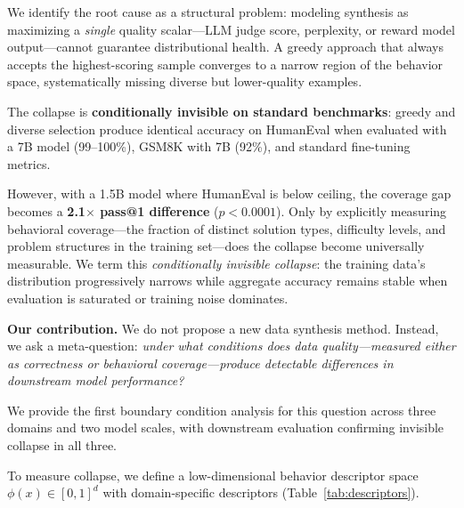 \documentclass{article}
\theoremstyle{plain}
\theoremstyle{remark}
\begin{document}
We identify the root cause as a structural problem: modeling synthesis as maximizing a \emph{single} quality scalar---LLM judge score, perplexity, or reward model output---cannot guarantee distributional health. A greedy approach that always accepts the highest-scoring sample converges to a narrow region of the behavior space, systematically missing diverse but lower-quality examples.

The collapse is \textbf{conditionally invisible on standard benchmarks}: greedy and diverse selection produce identical accuracy on HumanEval when evaluated with a 7B model (99--100\%), GSM8K with 7B (92\%), and standard fine-tuning metrics.

However, with a 1.5B model where HumanEval is below ceiling, the coverage gap becomes a \textbf{2.1$\times$ pass@1 difference} ($p{<}0.0001$).
Only by explicitly measuring behavioral coverage---the fraction of distinct solution types, difficulty levels, and problem structures in the training set---does the collapse become universally measurable.
We term this \emph{conditionally invisible collapse}: the training data's distribution progressively narrows while aggregate accuracy remains stable when evaluation is saturated or training noise dominates.

\textbf{Our contribution.}
We do not propose a new data synthesis method.
Instead, we ask a meta-question: \emph{under what conditions does data quality---measured either as correctness or behavioral coverage---produce detectable differences in downstream model performance?}

We provide the first boundary condition analysis for this question across three domains and two model scales, with downstream evaluation confirming invisible collapse in all three.

To measure collapse, we define a low-dimensional behavior descriptor space $\phi(x) \in [0,1]^d$ with domain-specific descriptors (Table~\ref{tab:descriptors}).
\end{document}
